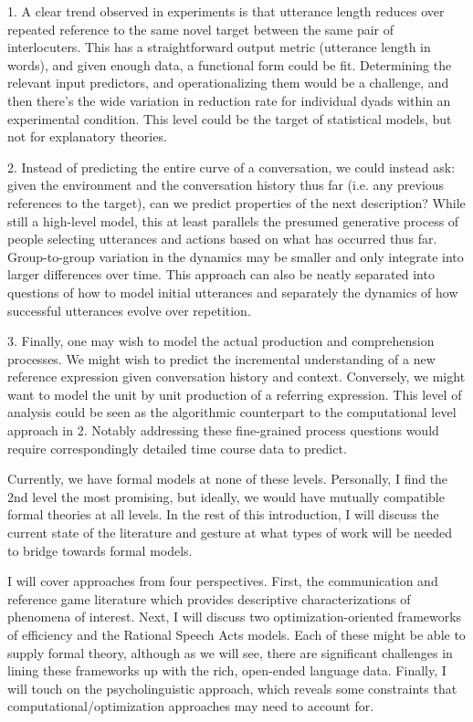 \documentclass[]{article}
\begin{document}
	1. A clear trend observed in experiments is that utterance length reduces over repeated reference to the same novel target between the same pair of interlocuters. This has a straightforward output metric (utterance length in words), and given enough data, a functional form could be fit.  Determining the relevant input predictors, and operationalizing them would be a challenge, and then there's the wide variation in reduction rate for individual dyads within an experimental condition. This level could be the target of statistical models, but not for explanatory theories. 
	
	2. Instead of predicting the entire curve of a conversation, we could instead ask: given the environment and the conversation history thus far (i.e. any previous references to the target), can we predict properties of the next description? While still a high-level model, this at least parallels the presumed generative process of people selecting utterances and actions based on what has occurred thus far. Group-to-group variation in the dynamics may be smaller and only integrate into larger differences over time. This approach can also be neatly separated into questions of how to model initial utterances and separately the dynamics of how successful utterances evolve over repetition. 
	
	3. Finally, one may wish to model the actual production and comprehension processes. We might wish to predict the incremental understanding of a new reference expression given conversation history and context. Conversely, we might want to model the unit by unit production of a referring expression. This level of analysis could be seen as the algorithmic counterpart to the computational level approach in 2. Notably addressing these fine-grained process questions would require correspondingly detailed time course data to predict. 
	
	Currently, we have formal models at none of these levels. Personally, I find the 2nd level the most promising, but ideally, we would have mutually compatible formal theories at all levels. In the rest of this introduction, I will discuss the current state of the literature and gesture at what types of work will be needed to bridge towards formal models. 
	
	I will cover approaches from four perspectives. First, the communication and reference game literature which provides descriptive characterizations of phenomena of interest. Next, I will discuss two optimization-oriented frameworks of efficiency and the Rational Speech Acts models. Each of these might be able to supply formal theory, although as we will see, there are significant challenges in lining these frameworks up with the rich, open-ended language data. Finally, I will touch on the psycholinguistic approach, which reveals some constraints that computational/optimization approaches may need to account for. 
	
\end{document}

